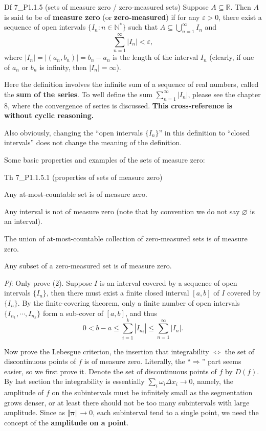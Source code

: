 \documentclass{article}
\begin{document}
\begin{Df}{Df 7\_P1.1.5 (sets of measure zero / zero-measured sets)}
    Suppose $A\subseteq\mathbb{R}$. Then $A$ is said to be of \textbf{measure zero} (or \textbf{zero-measured}) if for any $\varepsilon > 0$, there exist a sequence of open intervals $\{I_n: n\in\mathbb{N}^\ast\}$ such that $ A \subseteq \bigcup_{n=1}^{\infty} I_n$ and 
        $$ \sum_{n=1}^{\infty} |I_n| < \varepsilon, $$
    where $|I_n| = |(a_n, b_n)| = b_n - a_n$ is the length of the interval $I_n$ (clearly, if one of $a_n$ or $b_n$ is infinity, then $|I_n| = \infty$).
\end{Df}

Here the definition involves the infinite sum of a sequence of real numbers, called the \textbf{sum of the series}. To well define the sum $\sum_{n=1}^{\infty} |I_n|$, please see the chapter 8, where the convergence of series is discussed. \textbf{This cross-reference is without cyclic reasoning.}

Also obviously, \textcolor{Th}{changing the ``open intervals $\{I_n\}$'' in this definition to ``closed intervals'' does not change the meaning of the definition}.

Some basic properties and examples of the sets of measure zero:

\begin{Th}{Th 7\_P1.1.5.1 (properties of sets of measure zero)}
    \begin{compactenum}
        \item Any at-most-countable set is of measure zero.
        \item Any interval is not of measure zero (note that by convention we do not say $\varnothing$ is an interval).
        \item The union of at-most-countable collection of zero-measured sets is of measure zero.
        \item Any subset of a zero-measured set is of measure zero.
    \end{compactenum}
    \tcblower
    \textit{Pf}: Only prove (2). Suppose $I$ is an interval covered by a sequence of open intervals $\{I_n\}$, then there must exist a finite closed interval $[a,b]$ of $I$ covered by $\{I_n\}$. By the finite-covering theorem, only a finite number of open intervals $\{I_{n_1}, \cdots, I_{n_k}\}$ form a sub-cover of $[a,b]$, and thus
    $$ 0 < b-a \leq \sum_{i=1}^{k} |I_{n_i}| \leq \sum_{n=1}^{\infty} |I_n|. $$
\end{Th}

Now prove the Lebesgue criterion, the insertion that integrability $\Leftrightarrow$ the set of discontinuous points of $f$ is of measure zero. Literally, the ``$\Rightarrow$'' part seems easier, so we first prove it. Denote the set of discontinuous points of $f$ by $D(f)$. By last section the integrability is essentially $\sum_{i} \omega_i\Delta x_i \rightarrow 0$, namely, the amplitude of $f$ on the subintervals must be infinitely small as the segmentation grows denser, or at least there should not be too many subintervals with large amplitude. Since as $\Vert\pmb{\pi}\Vert\rightarrow 0$, each subinterval tend to a single point, we need the concept of the \textbf{amplitude on a point}.
\end{document}
